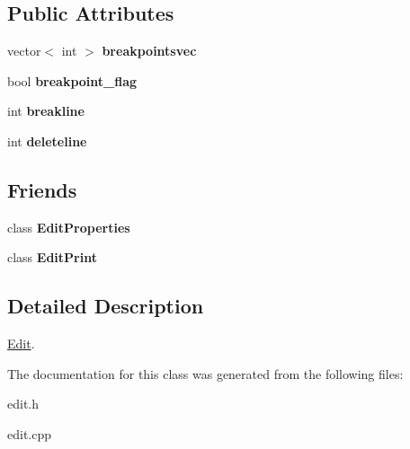 \subsection*{Public Attributes}
\begin{DoxyCompactItemize}
\item 
\hypertarget{class_edit_a6043a48f640f5ef2c1782282056c1dc9}{vector$<$ int $>$ {\bfseries breakpointsvec}}\label{class_edit_a6043a48f640f5ef2c1782282056c1dc9}

\item 
\hypertarget{class_edit_a6584a73601846b51c879a6d326fbb5f9}{bool {\bfseries breakpoint\+\_\+flag}}\label{class_edit_a6584a73601846b51c879a6d326fbb5f9}

\item 
\hypertarget{class_edit_ae685b10b41d57c5e65cc7c77f42d432d}{int {\bfseries breakline}}\label{class_edit_ae685b10b41d57c5e65cc7c77f42d432d}

\item 
\hypertarget{class_edit_a7a6f572c876e229c95d3294a62035958}{int {\bfseries deleteline}}\label{class_edit_a7a6f572c876e229c95d3294a62035958}

\end{DoxyCompactItemize}
\subsection*{Friends}
\begin{DoxyCompactItemize}
\item 
\hypertarget{class_edit_a500387361234a2fd8343f4673951f68d}{class {\bfseries Edit\+Properties}}\label{class_edit_a500387361234a2fd8343f4673951f68d}

\item 
\hypertarget{class_edit_abe05a77802c8bdef1ff7bdc9171d4391}{class {\bfseries Edit\+Print}}\label{class_edit_abe05a77802c8bdef1ff7bdc9171d4391}

\end{DoxyCompactItemize}


\subsection{Detailed Description}
\hyperlink{class_edit}{Edit}. 

The documentation for this class was generated from the following files\+:\begin{DoxyCompactItemize}
\item 
edit.\+h\item 
edit.\+cpp\end{DoxyCompactItemize}
